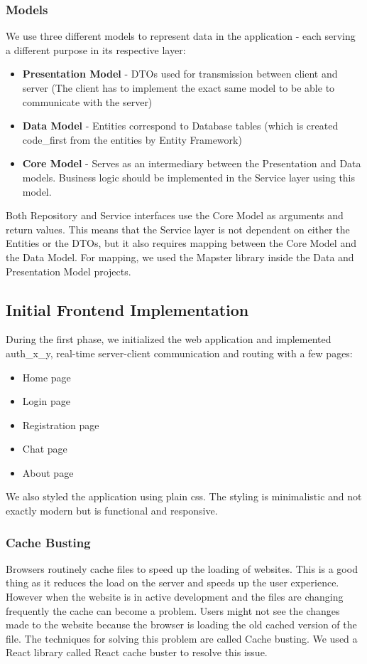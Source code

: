 \subsubsection*{Models}
We use three different models to represent data in the application - each serving a different purpose in its respective layer:
\begin{itemize}
    \item \textbf{Presentation Model} - DTOs used for transmission between client and server
 (The client has to implement the exact same model to be able to communicate with the server)
    \item \textbf{Data Model} - Entities correspond to Database tables
 (which is created \gls{code_first} from the entities by Entity Framework)
    \item \textbf{Core Model} - Serves as an intermediary between the Presentation and Data models.
 Business logic should be implemented in the Service layer using this model.
\end{itemize}

Both Repository and Service interfaces use the Core Model as arguments and return values.
This means that the Service layer is not dependent on either the Entities or the DTOs,
but it also requires mapping between the Core Model and the Data Model.
For mapping, we used the Mapster library inside the Data and Presentation Model projects.

\subsection{Initial Frontend Implementation}
During the first phase, we initialized the web application and implemented \gls{auth_x_y},
real-time server-client communication and routing with a few pages:
\begin{itemize}
    \item Home page
    \item Login page
    \item Registration page
    \item Chat page
    \item About page
\end{itemize}

We also styled the application using plain css. The styling is minimalistic and not exactly modern but is functional and responsive.

\subsubsection{Cache Busting}
\label{sec:cache_busting}
Browsers routinely cache files to speed up the loading of websites.
This is a good thing as it reduces the load on the server and speeds up the user experience.
However when the website is in active development and the files are changing frequently the cache can become a problem.
Users might not see the changes made to the website because the browser is loading the old cached version of the file.
The techniques for solving this problem are called Cache busting. We used a React library called React cache buster to resolve this issue.

